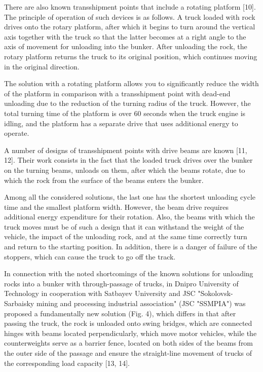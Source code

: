 \begin{multicols}{2}
There are also known transshipment points that include a rotating
platform {[}10{]}. The principle of operation of such devices is as
follows. A truck loaded with rock drives onto the rotary platform, after
which it begins to turn around the vertical axis together with the truck
so that the latter becomes at a right angle to the axis of movement for
unloading into the bunker. After unloading the rock, the rotary platform
returns the truck to its original position, which continues moving in
the original direction.

The solution with a rotating platform allows you to significantly reduce
the width of the platform in comparison with a transshipment point with
dead-end unloading due to the reduction of the turning radius of the
truck. However, the total turning time of the platform is over 60
seconds when the truck engine is idling, and the platform has a separate
drive that uses additional energy to operate.

A number of designs of transshipment points with drive beams are known
{[}11, 12{]}. Their work consists in the fact that the loaded truck
drives over the bunker on the turning beams, unloads on them, after
which the beams rotate, due to which the rock from the surface of the
beams enters the bunker.

Among all the considered solutions, the last one has the shortest
unloading cycle time and the smallest platform width. However, the beam
drive requires additional energy expenditure for their rotation. Also,
the beams with which the truck moves must be of such a design that it
can withstand the weight of the vehicle, the impact of the unloading
rock, and at the same time correctly turn and return to the starting
position. In addition, there is a danger of failure of the stoppers,
which can cause the truck to go off the track.

In connection with the noted shortcomings of the known solutions for
unloading rocks into a bunker with through-passage of trucks, in Dnipro
University of Technology in cooperation with Satbayev University and JSC
"Sokolovsk-Sarbaisky mining and processing industrial association" (JSC
"SSMPIA") was proposed a fundamentally new solution (Fig. 4), which
differs in that after passing the truck, the rock is unloaded onto swing
bridges, which are connected hinges with beams located perpendicularly,
which move motor vehicles, while the counterweights serve as a barrier
fence, located on both sides of the beams from the outer side of the
passage and ensure the straight-line movement of trucks of the
corresponding load capacity {[}13, 14{]}.


\end{multicols}
